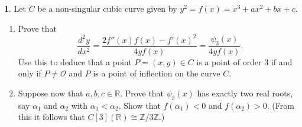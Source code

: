 \documentclass[12pt]{article}
\theoremstyle{definition}
\newtheorem{ex}{}
\begin{document}
\begin{ex}
	Let $C$ be a non-singular cubic curve given by $y^{2} = f(x) = x^{3} + ax^{2} + bx + c$.
	\begin{enumerate}[label=(\alph*)]
		\item Prove that
		      \begin{equation*}
			      \frac{d^{2} y}{dx^{2}} = \frac{2f''(x) f(x) - f'(x)^{2}}{4yf(x)} = \frac{\psi_{3}(x)}{4yf(x)}.
		      \end{equation*}
		      Use this to deduce that a point $P = (x,y) \in C$ is a point of order $3$
		      if and only if $P \ne \mathcal{O}$ and $P$ is a point of inflection on the curve $C$.
		\item Suppose now that $a, b, c \in \mathbb{R}$. Prove that $\psi_{3}(x)$ has
		      exactly two real roots, say $\alpha_{1}$ and $\alpha_{2}$ with
		      $\alpha_{1} < \alpha_{2}$. Show that $f(\alpha_{1}) < 0$ and
		      $f(\alpha_{2}) > 0$. (From this it follows that $C[3](\mathbb{R}) \cong \mathbb{Z}/3\mathbb{Z}$.)
	\end{enumerate}
\end{ex}
\end{document}
